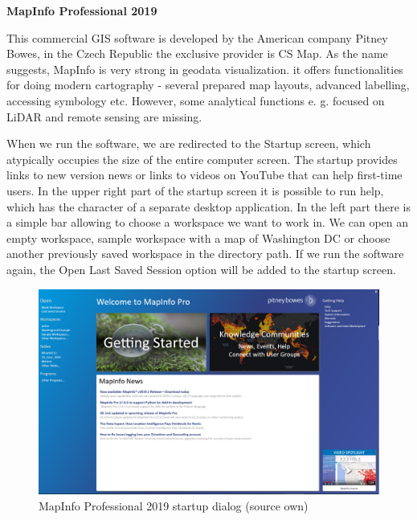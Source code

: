 \documentclass[a4paper,10pt,twoside]{article}
\begin{document}
\noindent \textbf {MapInfo Professional 2019}

\noindent This commercial GIS software is developed by the American company Pitney Bowes, in the Czech Republic the exclusive provider is CS Map. As the name suggests, MapInfo is very strong in geodata visualization. it offers functionalities for doing modern cartography - several prepared map layouts, advanced labelling, accessing symbology etc. However, some analytical functions e. g. focused on LiDAR and remote sensing are missing.

When we run the software, we are redirected to the Startup screen, which atypically occupies the size of the entire computer screen. The startup provides links to new version news or links to videos on YouTube that can help first-time users. In the upper right part of the startup screen it is possible to run help, which has the character of a separate desktop application. In the left part there is a simple bar allowing to choose a workspace we want to work in. We can open an empty workspace, sample workspace with a map of Washington DC or choose another previously saved workspace in the directory path. If we run the software again, the Open Last Saved Session option will be added to the startup screen.

\vspace{0.3cm}
\begin{figure}[hbt!] 
\begin{center}
\includegraphics[width=16cm]{../pictures/map_info_startup_screen.PNG} 
\caption[MapInfo Professional 2019 startup dialog (source own)]{MapInfo Professional 2019 startup dialog (source own)}
\label{fig:map_info_startup_screen}
\end{center}
\end{figure}
\end{document}
